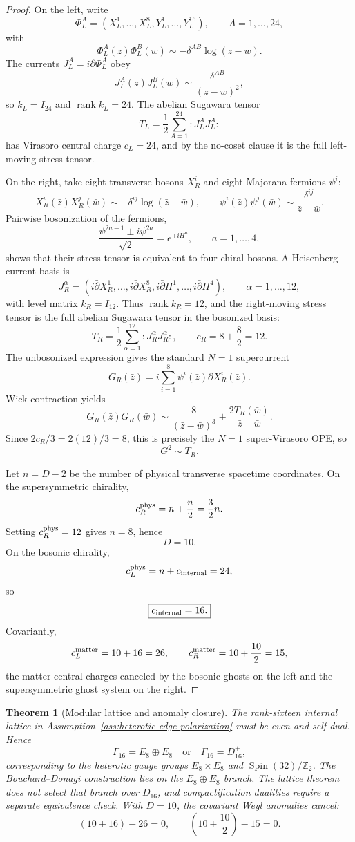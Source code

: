 \documentclass[11pt]{article}
\newtheorem{theorem}{Theorem}[section]
\theoremstyle{remark}
\theoremstyle{plain}
\newcommand{\Z}{\mathbb Z}
\begin{document}
\begin{proof}
On the left, write
\[
\Phi_L^A=(X_L^1,\ldots,X_L^8,Y_L^1,\ldots,Y_L^{16}),
\qquad
A=1,\ldots,24,
\]
with
\[
\Phi_L^A(z)\Phi_L^B(w)\sim-\delta^{AB}\log(z-w).
\]
The currents \(J_L^A=i\partial\Phi_L^A\) obey
\[
J_L^A(z)J_L^B(w)\sim\frac{\delta^{AB}}{(z-w)^2},
\]
so \(k_L=I_{24}\) and \(\operatorname{rank}k_L=24\). The abelian Sugawara tensor
\[
T_L=\frac12\sum_{A=1}^{24}:J_L^AJ_L^A:
\]
has Virasoro central charge \(c_L=24\), and by the no-coset clause it is the full left-moving stress
tensor.

On the right, take eight transverse bosons \(X_R^i\) and eight Majorana fermions \(\psi^i\):
\[
X_R^i(\bar z)X_R^j(\bar w)\sim-\delta^{ij}\log(\bar z-\bar w),
\qquad
\psi^i(\bar z)\psi^j(\bar w)\sim\frac{\delta^{ij}}{\bar z-\bar w}.
\]
Pairwise bosonization of the fermions,
\[
\frac{\psi^{2a-1}\pm i\psi^{2a}}{\sqrt2}=e^{\pm iH^a},
\qquad
a=1,\ldots,4,
\]
shows that their stress tensor is equivalent to four chiral bosons. A Heisenberg-current basis is
\[
J_R^\alpha=
\left(
i\bar\partial X_R^1,\ldots,i\bar\partial X_R^8,
i\bar\partial H^1,\ldots,i\bar\partial H^4
\right),
\qquad
\alpha=1,\ldots,12,
\]
with level matrix \(k_R=I_{12}\). Thus \(\operatorname{rank}k_R=12\), and the right-moving stress
tensor is the full abelian Sugawara tensor in the bosonized basis:
\[
T_R=\frac12\sum_{\alpha=1}^{12}:J_R^\alpha J_R^\alpha:,
\qquad
c_R=8+\frac82=12.
\]
The unbosonized expression gives the standard \(N=1\) supercurrent
\[
G_R(\bar z)=i\sum_{i=1}^{8}\psi^i(\bar z)\bar\partial X_R^i(\bar z).
\]
Wick contraction yields
\[
G_R(\bar z)G_R(\bar w)
\sim
\frac{8}{(\bar z-\bar w)^3}
+
\frac{2T_R(\bar w)}{\bar z-\bar w}.
\]
Since \(2c_R/3=2(12)/3=8\), this is precisely the \(N=1\) super-Virasoro OPE, so
\[
G^2\sim T_R.
\]

Let \(n=D-2\) be the number of physical transverse spacetime coordinates. On the supersymmetric
chirality,
\[
c_R^{\rm phys}=n+\frac n2=\frac32 n.
\]
Setting \(c_R^{\rm phys}=12\) gives \(n=8\), hence
\[
\boxed{D=10.}
\]
On the bosonic chirality,
\[
c_L^{\rm phys}=n+c_{\rm internal}=24,
\]
so
\[
\boxed{c_{\rm internal}=16.}
\]
Covariantly,
\[
c_L^{\rm matter}=10+16=26,
\qquad
c_R^{\rm matter}=10+\frac{10}{2}=15,
\]
the matter central charges canceled by the bosonic ghosts on the left and the
supersymmetric ghost system on the right.
\end{proof}

\begin{theorem}[Modular lattice and anomaly closure]
The rank-sixteen internal lattice in Assumption~\ref{ass:heterotic-edge-polarization} must be even
and self-dual. Hence
\[
\Gamma_{16}=E_8\oplus E_8
\quad\text{or}\quad
\Gamma_{16}=D_{16}^{+},
\]
corresponding to the heterotic gauge groups \(E_8\times E_8\) and
\(\operatorname{Spin}(32)/\Z_2\). The Bouchard--Donagi construction lies on the
\(E_8\oplus E_8\) branch. The lattice theorem does not select that branch over
\(D_{16}^{+}\), and compactification dualities require a separate equivalence check. With \(D=10\),
the covariant Weyl anomalies cancel:
\[
(10+16)-26=0,
\qquad
\left(10+\frac{10}{2}\right)-15=0.
\]
\end{theorem}
\end{document}
